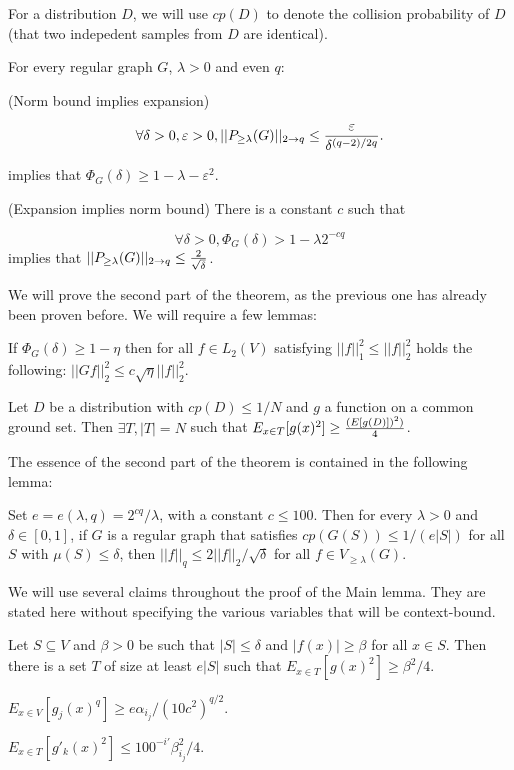 For a distribution $D$, we will use $cp(D)$ to denote the collision probability of $D$ (that two indepedent samples from $D$ are identical).

 For every regular graph $G$, $\lambda > 0$ and
even $q$:

\itemize\ibull

\: (Norm bound implies expansion)

$$\forall \delta > 0, \varepsilon >0, ||P_{\ge \lambda}(G)||_{2 \rightarrow q} \le {\varepsilon \over \delta^{(q-2)/2q}}.$$

implies that $\Phi_G(\delta) \ge 1 - \lambda - \varepsilon^2$.

\: (Expansion implies norm bound) There is a constant $c$ such that

$$\forall \delta > 0, \Phi_G(\delta) > 1 - \lambda 2^{-cq} $$
implies that $||P_{\ge \lambda}(G)||_{2 \rightarrow q} \le {2 \over \sqrt{\delta}}$.

\endlist

We will prove the second part of the theorem, as the previous one has
already been proven before. We will require a few lemmas:

 If $\Phi_G(\delta) \ge 1 - \eta$ then for all $f \in L_2(V)$ satisfying $||f||_1^2 \le ||f||_2^2$ holds the following: $||Gf||_2^2 \le c\sqrt{\eta} ||f||_2^2$.

\lem{} Let $D$ be a distribution with $cp(D) \le 1/N$ and $g$ a function on a common ground set. Then $\exists T, |T| = N$ such that $E_{x \in T}[g(x)^2] \ge {(E[g(D)])^2) \over 4}$.

The essence of the second part of the theorem is contained in the following lemma:

 Set $e = e(\lambda,q) = 2^{cq}/\lambda$, with a constant $c
\le 100$. Then for every $\lambda > 0$ and $\delta \in [0,1]$, if $G$ is a
regular graph that satisfies $cp(G(S)) \le 1/(e|S|)$ for all $S$ with $\mu(S)
\le \delta$, then $||f||_q \le 2||f||_2 / \sqrt{\delta}$ for all $f \in V_{\ge
\lambda}(G)$.

We will use several claims throughout the proof of the Main lemma. They are stated here without specifying the various variables that will be context-bound.

\lclaim{} Let $S \subseteq V$ and $\beta > 0$ be such that $|S| \le \delta$ and $|f(x)| \ge \beta$ for all $x \in S$. Then there is a set $T$ of size at least $e|S|$ such that $E_{x \in T}[g(x)^2] \ge \beta^2/4$.

\lclaim{} $E_{x \in V}[g_j(x)^q] \ge e \alpha_{i_j}/(10c^2)^{q/2}$.

 $E_{x \in T}[g'_{k}(x)^2] \le 100^{-i'} \beta_{i_j}^2 / 4$.

\bye

